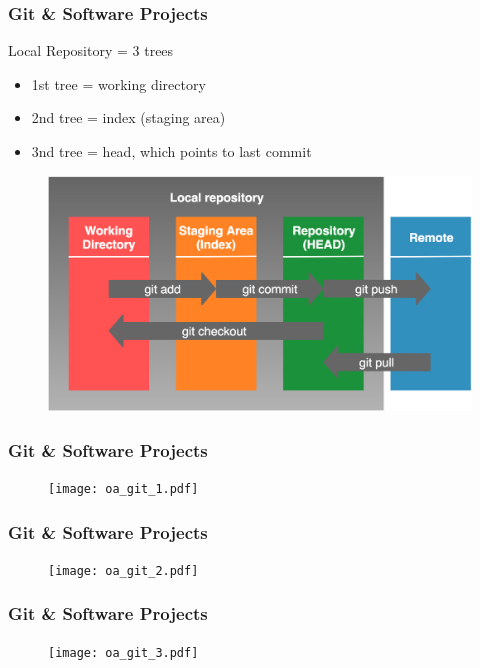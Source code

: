 \documentclass{beamer} %
\begin{document}
\begin{frame}[t]
\frametitle{Git \& Software Projects}
	Local Repository = 3 trees
\begin{itemize}
	\setlength\itemsep{0.5em}
	\item 1st tree = working directory
	\item 2nd tree = index (staging area)
	\item 3nd tree = head, which points to last commit
\end{itemize}
\begin{figure}
    \begin{center}
    	\includegraphics[scale=0.125]{assets/git-f1.png}
    \end{center}
\end{figure}
\end{frame}

\begin{frame}[t]
\frametitle{Git \& Software Projects}

\begin{figure}
    \begin{center}
    	\texttt{[image: oa\_git\_1.pdf]}
    \end{center}
\end{figure}
\end{frame}

\begin{frame}[t]
\frametitle{Git \& Software Projects}
\begin{figure}
    \begin{center}
    	\texttt{[image: oa\_git\_2.pdf]}
    \end{center}
\end{figure}
\end{frame}

\begin{frame}[t]
\frametitle{Git \& Software Projects}

\begin{figure}
    \begin{center}
    	\texttt{[image: oa\_git\_3.pdf]}
    \end{center}
\end{figure}
\end{frame}
\end{document}
